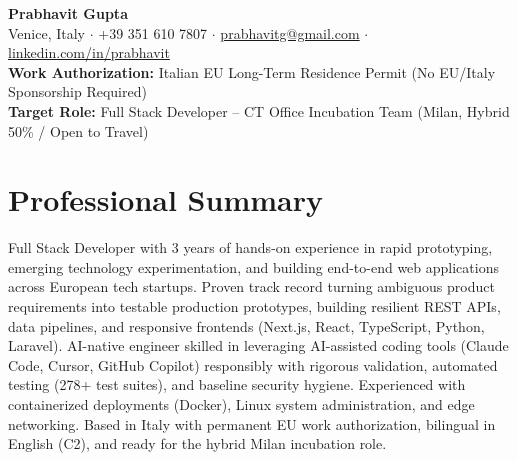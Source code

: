 \documentclass[10pt, a4paper]{article}
\begin{document}
\pagestyle{empty}

\begin{center}
    {\Huge\bfseries\color{darkslate} Prabhavit Gupta}\\[4pt]
    {\small
    Venice, Italy $\cdot$ +39 351 610 7807 $\cdot$ \href{mailto:prabhavitg@gmail.com}{prabhavitg@gmail.com} $\cdot$ \href{https://www.linkedin.com/in/prabhavit}{linkedin.com/in/prabhavit}\\[2pt]
    \textbf{Work Authorization:} Italian EU Long-Term Residence Permit (No EU/Italy Sponsorship Required)\\[1pt]
    \textbf{Target Role:} Full Stack Developer -- CT Office Incubation Team (Milan, Hybrid 50\% / Open to Travel)
    }
\end{center}
\vspace{-6pt}

\section*{Professional Summary}
Full Stack Developer with 3 years of hands-on experience in rapid prototyping, emerging technology experimentation, and building end-to-end web applications across European tech startups. Proven track record turning ambiguous product requirements into testable production prototypes, building resilient REST APIs, data pipelines, and responsive frontends (Next.js, React, TypeScript, Python, Laravel). AI-native engineer skilled in leveraging AI-assisted coding tools (Claude Code, Cursor, GitHub Copilot) responsibly with rigorous validation, automated testing (278+ test suites), and baseline security hygiene. Experienced with containerized deployments (Docker), Linux system administration, and edge networking. Based in Italy with permanent EU work authorization, bilingual in English (C2), and ready for the hybrid Milan incubation role.
\end{document}
